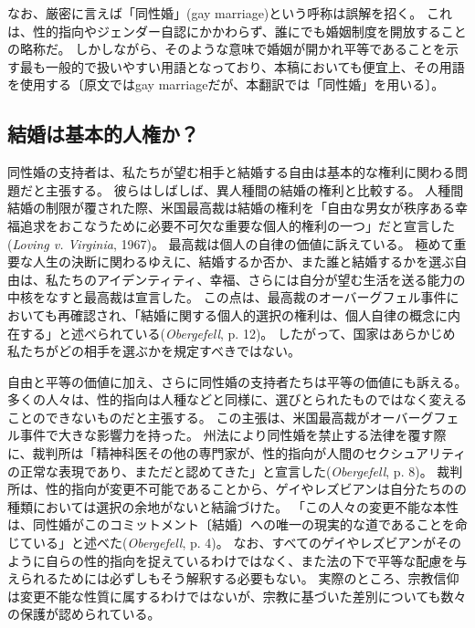 \documentclass[paper=a4,book,openany]{jlreq}
\begin{document}
なお、厳密に言えば「同性婚」(gay marriage)という呼称は誤解を招く。
これは、性的指向やジェンダー自認にかかわらず、誰にでも婚姻制度を開放することの略称だ。
しかしながら、そのような意味で婚姻が開かれ平等であることを示す最も一般的で扱いやすい用語となっており、本稿においても便宜上、その用語を使用する〔原文ではgay marriageだが、本翻訳では「同性婚」を用いる〕。

\subsection{結婚は基本的人権か？}

同性婚の支持者は、私たちが望む相手と結婚する自由は基本的な権利に関わる問題だと主張する。
彼らはしばしば、異人種間の結婚の権利と比較する。
人種間結婚の制限が覆された際、米国最高裁は結婚の権利を「自由な男女が秩序ある幸福追求をおこなうために必要不可欠な重要な個人的権利の一つ」だと宣言した(\emph{Loving v. Virginia}, 1967)。
最高裁は個人の自律の価値に訴えている。
極めて重要な人生の決断に関わるゆえに、結婚するか否か、また誰と結婚するかを選ぶ自由は、私たちのアイデンティティ、幸福、さらには自分が望む生活を送る能力の中核をなすと最高裁は宣言した。
この点は、最高裁のオーバーグフェル事件においても再確認され、「結婚に関する個人的選択の権利は、個人自律の概念に内在する」と述べられている(\emph{Obergefell}, p. 12)。
したがって、国家はあらかじめ私たちがどの相手を選ぶかを規定すべきではない。

自由と平等の価値に加え、さらに同性婚の支持者たちは平等の価値にも訴える。
多くの人々は、性的指向は人種などと同様に、選びとられたものではなく変えることのできないものだと主張する。
この主張は、米国最高裁がオーバーグフェル事件で大きな影響力を持った。
州法により同性婚を禁止する法律を覆す際に、裁判所は「精神科医その他の専門家が、性的指向が人間のセクシュアリティの正常な表現であり、まただと認めてきた」と宣言した(\emph{Obergefell}, p. 8)。
裁判所は、性的指向が変更不可能であることから、ゲイやレズビアンは自分たちのの種類においては選択の余地がないと結論づけた。
「この人々の変更不能な本性は、同性婚がこのコミットメント〔結婚〕への唯一の現実的な道であることを命じている」と述べた(\emph{Obergefell}, p. 4)。
なお、すべてのゲイやレズビアンがそのように自らの性的指向を捉えているわけではなく、また法の下で平等な配慮を与えられるためには必ずしもそう解釈する必要もない。
実際のところ、宗教信仰は変更不能な性質に属するわけではないが、宗教に基づいた差別についても数々の保護が認められている。
\end{document}

